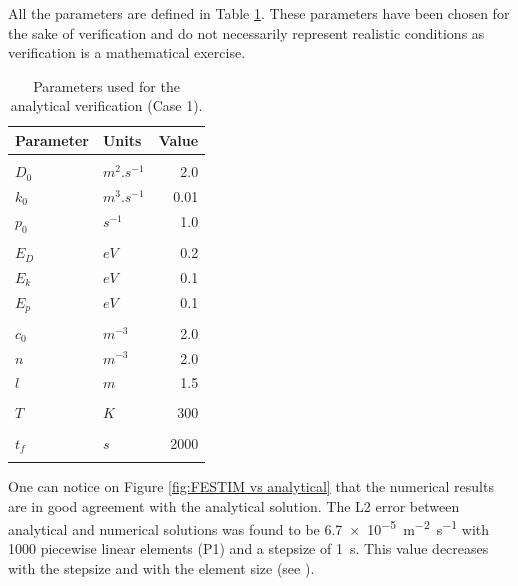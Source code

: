 All the parameters are defined in Table \ref{tab:parameters analytical verification}.
These parameters have been chosen for the sake of verification and do not necessarily represent realistic conditions as verification is a mathematical exercise.
\begin{table}
    \centering
    \begin{tabular}{p{2.3cm} p{2cm} r}
        Parameter & Units & Value \\
        \hline
        \\
        $D_0$ & $\si{m^2.s^{-1}}$ & 2.0 \\
        $k_0$ & $\si{m^3.s^{-1}}$ & 0.01 \\
        $p_0$ & $\si{s^{-1}}$ & 1.0 \\
        \\
        $E_D$ & $\si{eV}$ & 0.2 \\
        $E_k$ & $\si{eV}$ & 0.1 \\
        $E_p$ & $\si{eV}$ & 0.1 \\
        \\
        $c_0$ & $\si{m^{-3}}$ & 2.0 \\
        $n$ & $\si{m^{-3}}$ & 2.0 \\
        $l$ & $\si{m}$ & 1.5\\
        \\
        $T$ & $\si{K}$ & 300 \\
        \\
        $t_f$ & $\si{s}$ & 2000 \\
        \\
    \end{tabular}
    \caption{Parameters used for the analytical verification (Case 1).}
    \label{tab:parameters analytical verification}
\end{table}
One can notice on Figure \ref{fig:FESTIM vs analytical} that the numerical results are in good agreement with the analytical solution.
The L2 error between analytical and numerical solutions was found to be \SI{6.7e-5}{m^{-2}.s^{-1}} with 1000 piecewise linear elements (P1) and a stepsize of \SI{1}{s}.
This value decreases with the stepsize and with the element size (see ).

